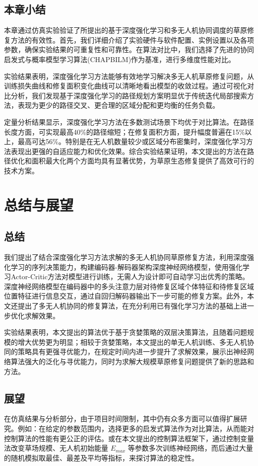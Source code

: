 \documentclass[AutoFakeBold]{LZUThesis}
\begin{document}
\section{本章小结}

本章通过仿真实验验证了所提出的基于深度强化学习和多无人机协同调度的草原修复方法的有效性。首先，我们详细介绍了实验硬件与软件配置、实例设置以及各项参数，确保实验结果的可重复性和可靠性。在算法对比中，我们选择了先进的协同启发式与概率模型学习算法(CHAPBILM)作为基准，进行多维度性能对比。

实验结果表明，深度强化学习方法能够有效地学习解决多无人机草原修复问题，从训练损失曲线和修复面积变化曲线可以清晰地看出模型的收敛过程。通过可视化对比分析，我们发现基于深度强化学习的路径规划方案明显优于传统迭代局部搜索方法，表现为更少的路径交叉、更合理的区域分配和更均衡的任务负载。

定量分析结果显示，深度强化学习方法在多数测试场景下均优于对比算法。在路径长度方面，可实现最高40\%的路径缩短；在修复面积方面，提升幅度普遍在15\%以上，最高可达56\%。特别是在无人机数量较少或区域分布密集时，深度强化学习方法表现出更强的自适应能力和优化效果。综合实验结果证明，本文提出的方法在路径优化和面积最大化两个方面均具有显著优势，为草原生态修复提供了高效可行的技术方案。
\chapter{总结与展望}

\section{总结}
我们提出了结合深度强化学习方法求解的多无人机协同草原修复方法，利用深度强化学习的序列决策能力，构建编码器-解码器架构深度神经网络模型，使用强化学习Actor-Critic方法对模型进行训练，无需人为设计即可自动学习出优秀的策略。深度神经网络模型在编码器中的多头注意力层对待修复区域个体特征和待修复区域位置特征进行信息交互，通过自回归解码器输出下一步可能的修复方案。此外，本文还提出了多无人机协同的修复算法，在充分利用已有强化学习方法的基础上进一步优化求解效果。

实验结果表明，本文提出的算法优于基于贪婪策略的双层决策算法，且随着问题规模的增大优势更为明显；相较于贪婪策略，本文提出的单无人机训练、多无人机协同的策略具有更强寻优能力，在规定时间内进一步提升了求解效果，展示出神经网络算法强大的泛化与寻优能力，同时为求解大规模草原修复问题提供了新的思路和方法。

\section{展望}
在仿真结果与分析部分，由于项目时间限制，其中仍有众多方面可以值得扩展研究。例如：在给定的参数范围内，选择更多的启发式算法作为对比算法，从而能对控制算法的性能有更公正的评估。或在本文提出的控制算法框架下，通过控制变量法改变草场规模、无人机初始能量 $E_{max}$ 等参数多次训练神经网络，而后通过大量的随机模拟取最佳、最差及平均等指标，来探讨算法的稳定性。
\end{document}
